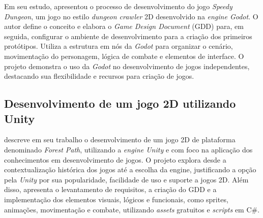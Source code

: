 Em seu estudo,  apresentou o processo de desenvolvimento do jogo \textit{Speedy Dungeon}, um jogo no estilo \textit{dungeon crawler} 2D desenvolvido na \textit{engine Godot}. O autor define o conceito e elabora o \textit{Game Design Document }(GDD) para, em seguida, configurar o ambiente de desenvolvimento para a criação dos primeiros protótipos. Utiliza a estrutura em nós da \textit{Godot} para organizar o cenário, movimentação do personagem, lógica de combate e elementos de interface. O projeto demonstra o uso da \textit{Godot} no desenvolvimento de jogos independentes, destacando sua flexibilidade e recursos para criação de jogos.

\subsection{Desenvolvimento de um jogo 2D utilizando Unity}

 descreve em seu trabalho o desenvolvimento de um jogo 2D de plataforma denominado \textit{Forest Path}, utilizando a \textit{engine Unity} e com foco na aplicação dos conhecimentos  em desenvolvimento de jogos. O projeto explora desde a contextualização histórica dos jogos até a escolha da engine, justificando a opção pela \textit{Unity} por sua popularidade, facilidade de uso e suporte a jogos 2D. Além disso, apresenta o levantamento de requisitos, a criação do GDD e a implementação dos elementos visuais, lógicos e funcionais, como sprites, animações, movimentação e combate, utilizando \textit{assets} gratuitos e \textit{scripts} em C\#.
